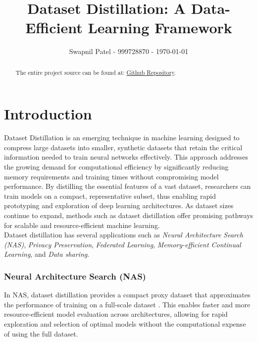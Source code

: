 \documentclass[conference, compsoc]{IEEEtran}
\begin{document}
\title{Dataset Distillation: A Data-Efficient Learning Framework}
\author{Swapnil Patel - 999728870 - \today}

\author{
	}

\maketitle

\begin{abstract}
\label{sec:abstract}
The entire project source can be found at: \href{https://github.com/Swapnil949/ECE1512_2024F_ProjectRepo_SwapnilPatel}{Github Repository}.

\end{abstract}

\section{Introduction}
\label{sec:intro}

Dataset Distillation is an emerging technique in machine learning designed to compress large datasets into smaller, synthetic datasets that retain the critical information needed to train neural networks effectively. This approach addresses the growing demand for computational efficiency by significantly reducing memory requirements and training times without compromising model performance. By distilling the essential features of a vast dataset, researchers can train models on a compact, representative subset, thus enabling rapid prototyping and exploration of deep learning architectures. As dataset sizes continue to expand, methods such as dataset distillation offer promising pathways for scalable and resource-efficient machine learning. \\

Dataset distillation has several applications such as \textit{Neural Architecture Search (NAS)}, \textit{Privacy Preservation}, \textit{Federated Learning}, \textit{Memory-efficient Continual Learning}, and \textit{Data sharing}.

\subsubsection*{Neural Architecture Search (NAS)}
In NAS, dataset distillation provides a compact proxy dataset that approximates the performance of training on a full-scale dataset \cite{white2023neuralarchitecturesearchinsights}. This enables faster and more resource-efficient model evaluation across architectures, allowing for rapid exploration and selection of optimal models without the computational expense of using the full dataset.
\end{document}
